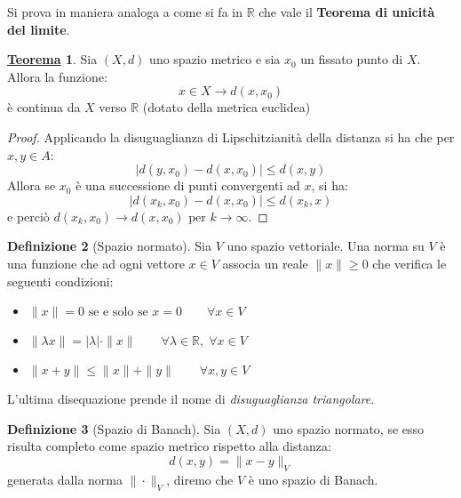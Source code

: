 \documentclass[a4paper,twoside]{article}
\newcommand{\R}{\mathbb{R}}
\theoremstyle{definition}
\newtheorem{theorem}{\color{Red}\underline{\textrm Teorema}}
\newtheorem{definizione}[theorem]{Definizione}
\numberwithin{theorem}{section}
\begin{document}
Si prova in maniera analoga a come si fa in $\R$ che vale il \textbf{Teorema di unicità del limite}.
\begin{theorem}
Sia $(X,d)$ uno spazio metrico e sia $x_0$ un fissato punto di $X$. Allora la funzione: $$x\in X\to d(x,x_0)$$
è continua da $X$ verso $\R$ (dotato della metrica euclidea)
\end{theorem}
\begin{proof}
    Applicando la disuguaglianza di Lipschitzianità della distanza si ha che per $x,y\in A$:
    $$|d(y,x_0)-d(x,x_0)|\leq d(x,y)$$
    Allora se $x_0$ è una successione di punti convergenti ad $x$, si ha: 
    $$|d(x_k,x_0)-d(x,x_0)|\leq d(x_k,x)$$
    e perciò $d(x_k,x_0)\to d(x,x_0)\text{ per } k\to\infty$.
\end{proof}
\begin{definizione}[Spazio normato]
Sia $V$ uno spazio vettoriale. Una norma su $V$ è una funzione che ad ogni vettore $x\in V$ associa un reale $\|x\|\geq 0$ che verifica le seguenti condizioni:
\begin{itemize}
    \item $\|x\|=0 \text{ se e solo se } x=0 \qquad \forall x\in V$
    \item $\|\lambda x\|=|\lambda|\cdot\|x\|\qquad \forall\lambda\in\R,\; \forall x\in V$
    \item $\|x+y\|\leq \|x\|+\|y\|\qquad \forall x,y\in V$
\end{itemize}
\end{definizione}
L'ultima disequazione prende il nome di \emph{disuguaglianza triangolare}.
\begin{definizione}[Spazio di Banach]
Sia $(X,d)$ uno spazio normato, se esso risulta completo come spazio metrico rispetto alla distanza: $$d(x,y)=\|x-y\|_V$$ generata dalla norma $\|\cdot\|_V$, diremo che $V$ è uno spazio di Banach.    
\end{definizione}
\end{document}
